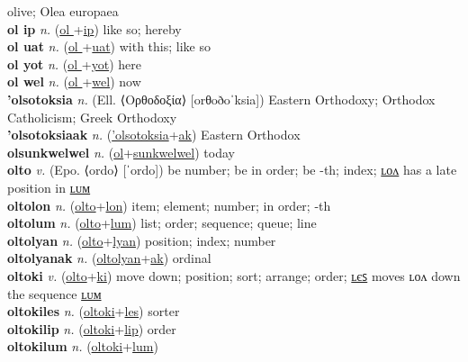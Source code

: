olive; Olea europaea \label{'oliwa} \\
\textbf{ol ip} \textit{n.} (\hyperref[ol ]{ol }+\hyperref[p]{ip})
like so; hereby \label{ol ip} \\
\textbf{ol uat} \textit{n.} (\hyperref[ol ]{ol }+\hyperref[at]{uat})
with this; like so \label{ol uat} \\
\textbf{ol yot} \textit{n.} (\hyperref[ol ]{ol }+\hyperref[ot]{yot})
here \label{ol yot} \\
\textbf{ol wel} \textit{n.} (\hyperref[ol ]{ol }+\hyperref[el]{wel})
now \label{ol wel} \\
\textbf{'olsotoksia} \textit{n.} (Ell. ⟨Ορθοδοξία⟩ [orθoðoˈksia])
Eastern Orthodoxy; Orthodox Catholicism; Greek Orthodoxy \label{'olsotoksia} \\
\textbf{'olsotoksiaak} \textit{n.} (\hyperref['olsotoksia]{'olsotoksia}+\hyperref[ak]{ak})
Eastern Orthodox \label{'olsotoksiaak} \\
\textbf{olsunkwelwel} \textit{n.} (\hyperref[ol]{ol}+\hyperref[sunkwelwel]{sunkwelwel})
today \label{olsunkwelwel} \\
\textbf{olto} \textit{v.} (Epo. ⟨ordo⟩ [ˈordo])
be number; be in order; be -th; index; \hyperref[oltolon]{ʟᴏᴧ} has a late position in \hyperref[oltolum]{ʟᴜᴍ} \label{olto} \\
\textbf{oltolon} \textit{n.} (\hyperref[olto]{olto}+\hyperref[lon]{lon})
item; element; number; in order; -th \label{oltolon} \\
\textbf{oltolum} \textit{n.} (\hyperref[olto]{olto}+\hyperref[lum]{lum})
list; order; sequence; queue; line \label{oltolum} \\
\textbf{oltolyan} \textit{n.} (\hyperref[olto]{olto}+\hyperref[lyan]{lyan})
position; index; number \label{oltolyan} \\
\textbf{oltolyanak} \textit{n.} (\hyperref[oltolyan]{oltolyan}+\hyperref[ak]{ak})
ordinal \label{oltolyanak} \\
\textbf{oltoki} \textit{v.} (\hyperref[olto]{olto}+\hyperref[ki]{ki})
move down; position; sort; arrange; order; \hyperref[oltokiles]{ʟєꜱ} moves ʟᴏᴧ down the sequence \hyperref[oltokilum]{ʟᴜᴍ} \label{oltoki} \\
\textbf{oltokiles} \textit{n.} (\hyperref[oltoki]{oltoki}+\hyperref[les]{les})
sorter \label{oltokiles} \\
\textbf{oltokilip} \textit{n.} (\hyperref[oltoki]{oltoki}+\hyperref[lip]{lip})
order \label{oltokilip} \\
\textbf{oltokilum} \textit{n.} (\hyperref[oltoki]{oltoki}+\hyperref[lum]{lum})
